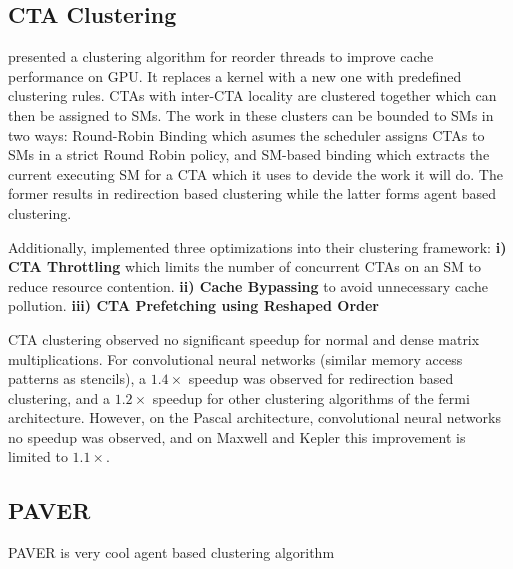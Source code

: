 \subsection{CTA Clustering}
\citeauthor{li2017locality} presented a clustering algorithm for reorder threads to improve cache performance on GPU.
It replaces a kernel with a new one with predefined clustering rules.
CTAs with inter-CTA locality are clustered together which can then be assigned to SMs.
The work in these clusters can be bounded to SMs in two ways:
Round-Robin Binding which asumes the scheduler assigns CTAs to SMs in a strict Round Robin policy, and SM-based binding which extracts the current executing SM for a CTA which it uses to devide the work it will do.
The former results in redirection based clustering while the latter forms agent based clustering.

Additionally, \citeauthor{li2017locality} implemented three optimizations into their clustering framework: 
\textbf{i) CTA Throttling} which limits the number of concurrent CTAs on an SM to reduce resource contention.
\textbf{ii) Cache Bypassing} to avoid unnecessary cache pollution.
\textbf{iii) CTA Prefetching using Reshaped Order}

CTA clustering observed no significant speedup for normal and dense matrix multiplications.
For convolutional neural networks (similar memory access patterns as stencils), a $1.4\times$ speedup was observed for redirection based clustering, and a $1.2\times$ speedup for other clustering algorithms of the fermi architecture.
However, on the Pascal architecture, convolutional neural networks no speedup was observed, and on Maxwell and Kepler this improvement is limited to $1.1\times$.

\subsection{PAVER}
PAVER is very cool agent based clustering algorithm
